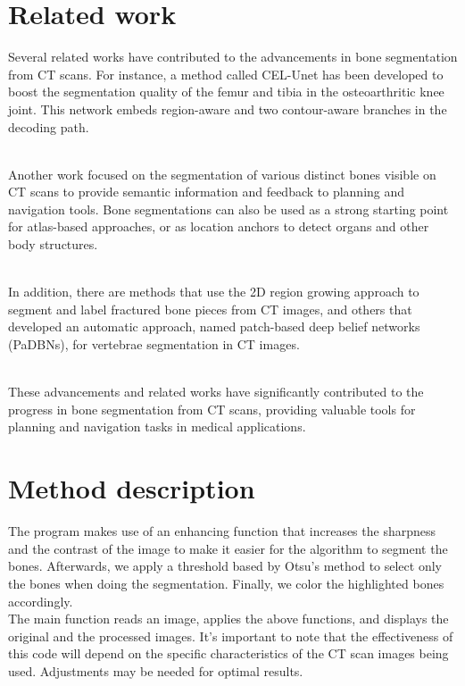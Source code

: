 \documentclass[conference]{IEEEtran}
\begin{document}
\section{Related work}
Several related works have contributed to the advancements in bone segmentation from CT scans. For instance, a method called CEL-Unet has been developed to boost the segmentation quality of the femur and tibia in the osteoarthritic knee joint. This network embeds region-aware and two contour-aware branches in the decoding path.

\\Another work focused on the segmentation of various distinct bones visible on CT scans to provide semantic information and feedback to planning and navigation tools. Bone segmentations can also be used as a strong starting point for atlas-based approaches, or as location anchors to detect organs and other body structures.

\\In addition, there are methods that use the 2D region growing approach to segment and label fractured bone pieces from CT images, and others that developed an automatic approach, named patch-based deep belief networks (PaDBNs), for vertebrae segmentation in CT images.

\\These advancements and related works have significantly contributed to the progress in bone segmentation from CT scans, providing valuable tools for planning and navigation tasks in medical applications.

\section{Method description}
The program makes use of an enhancing function that increases the sharpness and the contrast of the image to make it easier for the algorithm to segment the bones. Afterwards, we apply a threshold based by Otsu's method to select only the bones when doing the segmentation. Finally, we color the highlighted bones accordingly.
\\The main function reads an image, applies the above functions, and displays the original and the processed images. It’s important to note that the effectiveness of this code will depend on the specific characteristics of the CT scan images being used. Adjustments may be needed for optimal results.
\end{document}
